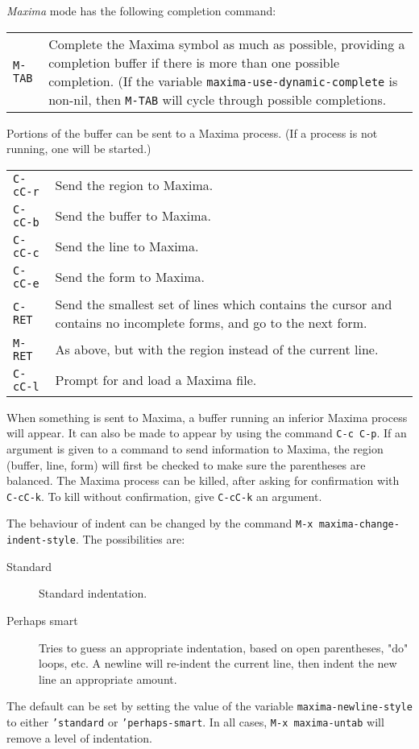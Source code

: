 \documentclass{article}
\newcommand{\mx}{\textsl{\sffamily Maxima}}
\begin{document}
\noindent
\mx{} mode has the following completion command:

\begin{tabular}{p{\firstcol}p{\secondcol}}
\texttt{M-TAB} & Complete the Maxima symbol as much as possible, providing
     a completion buffer if there is more than one possible
     completion.  (If the variable
     \texttt{maxima-use-dynamic-complete} is non-nil, then
     \texttt{M-TAB} will cycle through possible completions.
\end{tabular}

Portions of the buffer can be sent to a Maxima process.  (If a process is 
not running, one will be started.)

\begin{tabular}{p{\firstcol}p{\secondcol}}
\texttt{C-cC-r} & Send the region to Maxima.\\
\texttt{C-cC-b} & Send the buffer to Maxima.\\
\texttt{C-cC-c} & Send the line to Maxima.\\
\texttt{C-cC-e} & Send the form to Maxima.\\
\texttt{C-RET} & Send the smallest set of lines which contains
the cursor and contains no incomplete forms, and go to the next form.\\
\texttt{M-RET} &  As above, but with the region instead of the current line.\\
\texttt{C-cC-l} & Prompt for and load a Maxima file.
\end{tabular}

\noindent
When something is sent to Maxima, a buffer running an inferior Maxima 
process will appear.  It can also be made to appear by using the command
\texttt{C-c C-p}.
If an argument is given to a command to send information to Maxima,
the region (buffer, line, form) will first be checked to make sure
the parentheses are balanced.
The Maxima process can be killed, after asking for confirmation 
with \texttt{C-cC-k}.  To kill without confirmation, give \texttt{C-cC-k}
an argument.

The behaviour of indent can be changed by the command 
\texttt{M-x maxima-change-indent-style}.  The possibilities are:
\begin{description}
\item[Standard]      Standard indentation.
\item[Perhaps smart] Tries to guess an appropriate indentation, based on
               open parentheses, "do" loops, etc.
               A newline will re-indent the current line, then indent
               the new line an appropriate amount.
\end{description}
The default can be set by setting the value of the variable 
\texttt{maxima-newline-style} to either 
\texttt{'standard} or \texttt{'perhaps-smart}.
In all cases, \texttt{M-x maxima-untab} will remove a level of indentation.
\end{document}

